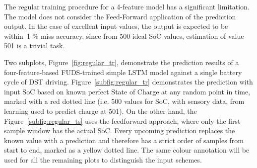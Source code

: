 The regular training procedure for a 4-feature model has a significant limitation. The model does not consider the Feed-Forward application of the prediction output.
In the case of excellent input values, the output is expected to be within~1 \% miss accuracy, since from 500 ideal SoC values, estimation of value 501 is a trivial task.

%
%
Two subplots, \mbox{Figure~\ref{fig:regular_tr}}, demonstrate the prediction results of a four-feature-based FUDS-trained simple LSTM model against a single battery cycle of DST driving.
\mbox{Figure~\ref{subfig:regular_tr}} demonstrates the prediction with input SoC based on known perfect State of Charge at any random point in time, marked with a red dotted line (i.e. 500 values for SoC, with sensory data, from learning used to predict charge at 501).
On the other hand, the \mbox{Figure~\ref{subfig:regular_ts}} uses the feedforward approach, where only the first sample window has the actual SoC.
Every upcoming prediction replaces the known value with a prediction and therefore has a strict order of samples from start to end, marked as a yellow dotted line.
The same colour annotation will be used for all the remaining plots to distinguish the input schemes.

